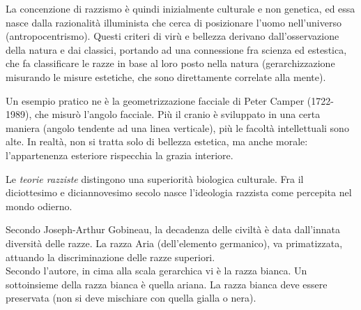 \documentclass[a4paper]{article}
\begin{document}
La concenzione di razzismo è quindi inizialmente culturale e non genetica,
ed essa nasce dalla razionalità illuminista che cerca di posizionare l'uomo nell'universo (antropocentrismo).
Questi criteri di virù e bellezza derivano dall'osservazione della natura e dai classici,
portando ad una connessione fra scienza ed estestica, che fa classificare le razze
in base al loro posto nella natura (gerarchizzazione misurando le misure estetiche, che
sono direttamente correlate alla mente).

Un esempio pratico ne è la geometrizzazione facciale di Peter Camper (1722-1989),
che misurò l'angolo facciale. Più il cranio è sviluppato in una certa maniera (angolo tendente ad una linea verticale),
più le facoltà intellettuali sono alte. In realtà, non si
tratta solo di bellezza estetica, ma anche morale: l'appartenenza esteriore rispecchia
la grazia interiore.


Le \textit{teorie razziste} distingono una superiorità biologica culturale.
Fra il diciottesimo e diciannovesimo secolo nasce l'ideologia razzista come percepita nel mondo odierno.

Secondo Joseph-Arthur Gobineau, la decadenza delle civiltà è data dall'innata
diversità delle razze. La razza Aria (dell'elemento germanico),
va primatizzata, attuando la discriminazione delle razze superiori.\\
Secondo l'autore, in cima alla scala gerarchica vi è la razza bianca.
Un sottoinsieme della razza bianca è quella ariana.
La razza bianca deve essere preservata (non si deve mischiare con quella gialla o nera).

\end{document}
